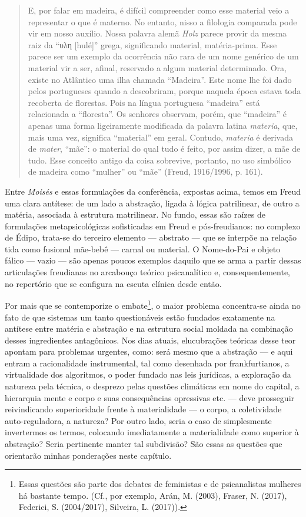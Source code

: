 \begin{quote}
E, por falar em madeira, é difícil compreender como esse material veio a
representar o que é materno. No entanto, nisso a filologia comparada
pode vir em nosso auxílio. Nossa palavra alemã \emph{Holz} parece provir
da mesma raiz da ``υλη {[}hulé{]}'' grega, significando material,
matéria-prima. Esse parece ser um exemplo da ocorrência não rara de um
nome genérico de um material vir a ser, afinal, reservado a algum
material determinado. Ora, existe no Atlântico uma ilha chamada
``Madeira''. Este nome lhe foi dado pelos portugueses quando a
descobriram, porque naquela época estava toda recoberta de florestas.
Pois na língua portuguesa ``madeira'' está relacionada a ``floresta''.
Os senhores observam, porém, que ``madeira'' é apenas uma forma
ligeiramente modificada da palavra latina \emph{materia}, que, mais uma
vez, significa ``material'' em geral. Contudo, \emph{materia} é derivada
de \emph{mater}, ``mãe'': o material do qual tudo é feito, por assim
dizer, a mãe de tudo. Esse conceito antigo da coisa sobrevive, portanto,
no uso simbólico de madeira como ``mulher'' ou ``mãe'' (Freud,
1916/1996, p. 161).
\end{quote}

Entre \emph{Moisés} e essas formulações da conferência, expostas acima,
temos em Freud uma clara antítese: de um lado a abstração, ligada à
lógica patrilinear, de outro a matéria, associada à estrutura
matrilinear. No fundo, essas são raízes de formulações metapsicológicas
sofisticadas em Freud e pós-freudianos: no complexo de Édipo, trata-se
do terceiro elemento --- abstrato --- que se interpõe na relação tida como
fusional mãe-bebê --- carnal ou material. O Nome-do-Pai e objeto fálico
--- vazio --- são apenas poucos exemplos daquilo que se arma a partir
dessas articulações freudianas no arcabouço teórico psicanalítico e,
consequentemente, no repertório que se configura na escuta clínica desde
então.

Por mais que se contemporize o embate\footnote{Essas questões são parte
  dos debates de feministas e de psicanalistas mulheres há bastante
  tempo. (Cf., por exemplo, Arán, M. (2003), Fraser, N. (2017),
  Federici, S. (2004/2017), Silveira, L. (2017)).}, o maior problema
concentra-se ainda no fato de que sistemas um tanto questionáveis estão
fundados exatamente na antítese entre matéria e abstração e na estrutura
social moldada na combinação desses ingredientes antagônicos. Nos dias
atuais, elucubrações teóricas desse teor apontam para problemas
urgentes, como: será mesmo que a abstração --- e aqui entram a
racionalidade instrumental, tal como desenhada por frankfurtianos, a
virtualidade dos algoritmos, o poder fundado nas leis jurídicas, a
exploração da natureza pela técnica, o desprezo pelas questões
climáticas em nome do capital, a hierarquia mente e corpo e suas
consequências opressivas etc. --- deve prosseguir reivindicando
superioridade frente à materialidade --- o corpo, a coletividade
auto-reguladora, a natureza? Por outro lado, seria o caso de
simplesmente invertermos os termos, colocando imediatamente a
materialidade como superior à abstração? Seria pertinente manter tal
subdivisão? São essas as questões que orientarão minhas ponderações
neste capítulo.

